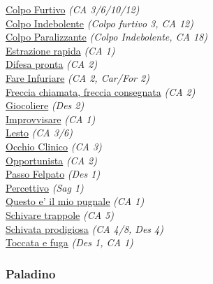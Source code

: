 \begin{multicols}{3}
{\begin{flushleft}
\hyperlink{Colpo Furtivo}{Colpo Furtivo} \textit{(CA 3/6/10/12)}\\
\hyperlink{Colpo Indebolente}{Colpo Indebolente} \textit{(Colpo furtivo 3, CA 12)}\\
\hyperlink{Colpo Paralizzante}{Colpo Paralizzante} \textit{(Colpo Indebolente, CA 18)}\\
\hyperlink{Estrazione rapida}{Estrazione rapida} \textit{(CA 1)}\\
\hyperlink{Difesa pronta}{Difesa pronta} \textit{(CA 2)}\\
\hyperlink{Fare Infuriare}{Fare Infuriare} \textit{(CA 2, Car/For 2)}\\
\hyperlink{Freccia chiamata, freccia consegnata}{Freccia chiamata, freccia consegnata} \textit{(CA 2)}\\
\hyperlink{Giocoliere}{Giocoliere} \textit{(Des 2)}\\
\hyperlink{Improvvisare}{Improvvisare} \textit{(CA 1)}\\
\hyperlink{Lesto}{Lesto} \textit{(CA 3/6)}\\
\hyperlink{Occhio Clinico}{Occhio Clinico} \textit{(CA 3)}\\
\hyperlink{Opportunista}{Opportunista} \textit{(CA 2)}\\
\hyperlink{Passo Felpato}{Passo Felpato} \textit{(Des 1)}\\
\hyperlink{Percettivo}{Percettivo} \textit{(Sag 1)}\\
\hyperlink{Questo e' il mio pugnale}{Questo e' il mio pugnale} \textit{(CA 1)}\\
\hyperlink{Schivare trappole}{Schivare trappole} \textit{(CA 5)}\\
\hyperlink{Schivata prodigiosa}{Schivata prodigiosa} \textit{(CA 4/8, Des 4)}\\
\hyperlink{Toccata e fuga}{Toccata e fuga} \textit{(Des 1, CA 1)}\\

\titlespacing*{\subsubsection}{0pt}{0.5em}{0.5em}\subsubsection*{Paladino}


\end{flushleft}}
\end{multicols}
